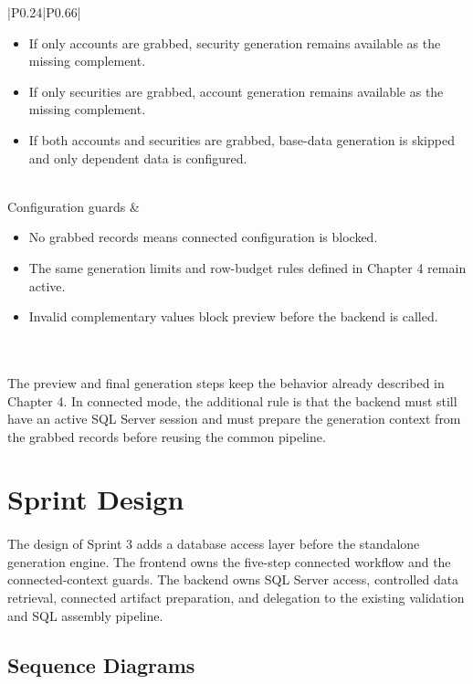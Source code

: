\begin{longtable}{|P{0.24\linewidth}|P{0.66\linewidth}|}
\begin{itemize}[leftmargin=*,nosep]
    \item If only accounts are grabbed, security generation remains available as the missing complement.
    \item If only securities are grabbed, account generation remains available as the missing complement.
    \item If both accounts and securities are grabbed, base-data generation is skipped and only dependent data is configured.
\end{itemize} \\
\hline
Configuration guards &
\begin{itemize}[leftmargin=*,nosep]
    \item No grabbed records means connected configuration is blocked.
    \item The same generation limits and row-budget rules defined in Chapter 4 remain active.
    \item Invalid complementary values block preview before the backend is called.
\end{itemize} \\
\hline
\end{longtable}
\renewcommand{\arraystretch}{1}

\paragraph{}The preview and final generation steps keep the behavior already described in Chapter 4.
In connected mode, the additional rule is that the backend must still have an active SQL Server
session and must prepare the generation context from the grabbed records before reusing the common
pipeline.

\section{Sprint Design}

\paragraph{}The design of Sprint 3 adds a database access layer before the standalone generation engine.
The frontend owns the five-step connected workflow and the connected-context guards. The backend
owns SQL Server access, controlled data retrieval, connected artifact preparation, and delegation to
the existing validation and SQL assembly pipeline.

\subsection{Sequence Diagrams}

